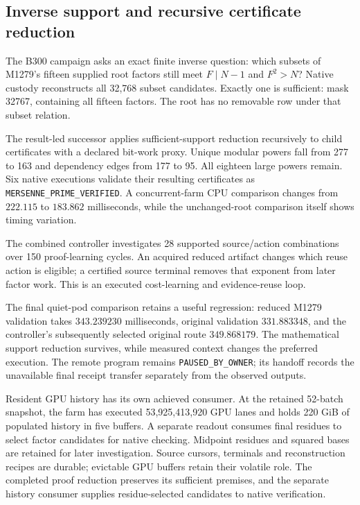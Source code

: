 \subsection{Inverse support and recursive certificate reduction}

The B300 campaign asks an exact finite inverse question:
which subsets of M1279's fifteen supplied root factors still
meet \(F\mid N-1\) and \(F^2>N\)? Native custody reconstructs
all 32,768 subset candidates. Exactly one is sufficient:
mask 32767, containing all fifteen factors. The root has
no removable row under that subset relation.

The result-led successor applies sufficient-support reduction
recursively to child certificates with a declared bit-work
proxy. Unique modular powers fall from 277 to 163 and
dependency edges from 177 to 95. All eighteen large powers
remain. Six native executions validate their resulting
certificates as \texttt{MERSENNE\_PRIME\_VERIFIED}.
A concurrent-farm CPU comparison changes from \(222.115\)
to \(183.862\) milliseconds, while the unchanged-root
comparison itself shows timing variation.

The combined controller investigates 28 supported
source/action combinations over 150 proof-learning cycles.
An acquired reduced artifact changes which reuse action
is eligible; a certified source terminal removes that
exponent from later factor work. This is an executed
cost-learning and evidence-reuse loop.

The final quiet-pod comparison retains a useful regression:
reduced M1279 validation takes \(343.239230\)
milliseconds, original validation \(331.883348\), and the
controller's subsequently selected original route
\(349.868179\). The mathematical support reduction
survives, while measured context changes the preferred
execution. The remote program remains
\texttt{PAUSED\_BY\_OWNER}; its handoff records the
unavailable final receipt transfer separately from the
observed outputs.

Resident GPU history has its own achieved consumer.
At the retained 52-batch snapshot, the farm has executed
53,925,413,920 GPU lanes and holds 220 GiB of populated
history in five buffers. A separate readout consumes
final residues to select factor candidates for native
checking. Midpoint residues and squared bases are
retained for later investigation. Source cursors,
terminals and reconstruction recipes are durable;
evictable GPU buffers retain their volatile role.
The completed proof reduction preserves its sufficient premises, and the separate history consumer supplies residue-selected candidates to native verification.

